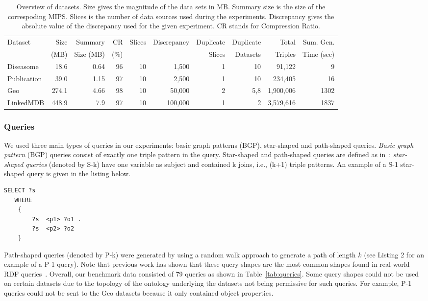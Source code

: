 \documentclass{sig-alternate}  %
\begin{document}
\begin{table}
\centering
\begin{tabular}{lrrrrrrrrr}
\hline
Dataset & Size  & Summary 	& CR   & Slices & Discrepancy & Duplicate  & Duplicate & Total 	& Sum. Gen. \\
				& (MB) 	& Size (MB) & (\%) &	  		 &  					 & Slices 		& Datasets 	& Triples & Time (sec)\\
\hline
Diseasome 			& 18.6 	& 0.64 	& 96 & 10 & 1,500 		& 1 & 10 			& 91,122 & 9\\
Publication 						& 39.0	& 1.15 	& 97 & 10 & 2,500 		& 1 & 10 			& 234,405 & 16\\
Geo 						& 274.1 & 4.66 	& 98 & 10 & 50,000 	& 2 & 5,8				& 1,900,006 & 1302\\
LinkedMDB 			& 448.9 & 7.9 	& 97 & 10 & 100,000 	& 1 & 2 			& 3,579,616 & 1837\\
\hline
\end{tabular}
\caption{Overview of datasets. Size gives the magnitude of the data sets in MB. Summary size is the size of the correspoding MIPS. Slices is the number of data sources used during the experiments. Discrepancy gives the absolute value of the discrepancy used for the given experiment. CR stands for Compression Ratio.}
\label{tab:datasets}
\end{table}


\subsubsection{Queries}
We used three main types of queries in our experiments: basic graph patterns (BGP), star-shaped and path-shaped queries.
\emph{Basic graph pattern} (BGP) queries consist of exactly one triple pattern in the query.
Star-shaped and path-shaped queries are defined as in~\cite{key-5}: \emph{star-shaped queries} (denoted by S-k) have one variable as subject and contained k joins, i.e., (k+1) triple patterns.
An example of a S-1 star-shaped query is given in the listing below.
\begin{lstlisting}[caption = {A S-1 query example},basicstyle={\tiny},frame = single,language=SPARQL]
 SELECT ?s 
   WHERE
    {
        ?s  <p1> ?o1 .
        ?s  <p2> ?o2
    }
\end{lstlisting}
Path-shaped queries (denoted by P-k) were generated by using a random walk approach to generate a path of length $k$ (see Listing 2 for an example of a P-1 query). 
Note that previous work has shown that these query shapes are the most common shapes found in real-world RDF queries~\cite{key-35}.
Overall, our benchmark data consisted of 79 queries as shown in Table~\ref{tab:queries}.
Some query shapes could not be used on certain datasets due to the topology of the ontology underlying the datasets not being permissive for such queries. 
For example, P-1 queries could not be sent to the Geo datasets because it only contained object properties.
\end{document}
